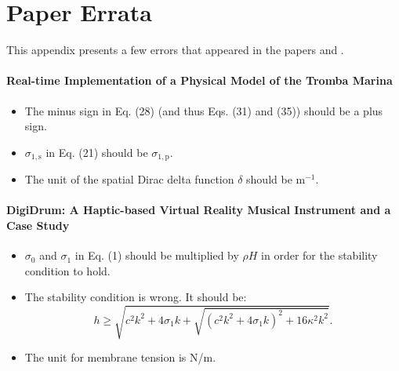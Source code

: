 \chapter{Paper Errata}\label{app:paperErrata}
This appendix presents a few errors that appeared in the papers \citeP[D] and \citeP[F].
\subsubsection{Real-time Implementation of a Physical Model of the Tromba Marina \citeP[D]}
\begin{itemize}
    \item The minus sign in Eq. (28) (and thus Eqs. (31) and (35)) should be a plus sign.
    \item $\sigma_{1,\text{s}}$ in Eq. (21) should be $\sigma_{1,\text{p}}$.
    \item The unit of the spatial Dirac delta function $\delta$ should be m$^{-1}$.
\end{itemize}
%
\subsubsection{DigiDrum: A Haptic-based Virtual Reality Musical Instrument and a Case Study \citeP[F]}
\begin{itemize}
    \item $\sigma_0$ and $\sigma_1$ in Eq. (1) should be multiplied by $\rho H$ in order for the stability condition to hold.
    \item The stability condition is wrong. It should be: 
    \begin{equation}
        h \geq \sqrt{c^2k^2 + 4\sigma_1k + \sqrt{(c^2k^2+4\sigma_1k)^2 + 16\kappa^2k^2}}.
    \end{equation}
    \item The unit for membrane tension is N/m.
\end{itemize}
